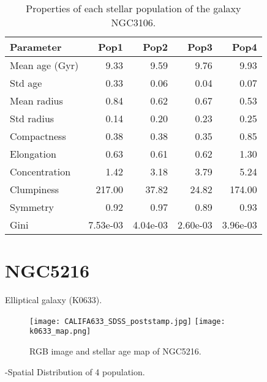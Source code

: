 \begin{table}[h]
\centering
\begin{tabular}{l|r|r|r|r}
Parameter & Pop1 & Pop2 & Pop3 & Pop4 \\\hline
Mean age (Gyr) & 9.33 & 9.59 & 9.76 & 9.93 \\
Std age & 0.33 & 0.06 & 0.04 & 0.07 \\
Mean radius & 0.84 & 0.62 & 0.67 & 0.53 \\
Std radius & 0.14 & 0.20 & 0.23 & 0.25 \\
Compactness & 0.38 & 0.38 & 0.35 & 0.85 \\
Elongation & 0.63 & 0.61 & 0.62 & 1.30 \\
Concentration & 1.42 & 3.18 & 3.79 & 5.24  \\
Clumpiness & 217.00 & 37.82 & 24.82 & 174.00 \\
Symmetry & 0.92 & 0.97 & 0.89 & 0.93 \\
Gini & 7.53e-03 & 4.04e-03 & 2.60e-03 & 3.96e-03 \\
\end{tabular}
\caption{\label{tab:widgets}Properties of each stellar population of the galaxy NGC3106.}
\end{table}

\newpage
\section*{NGC5216}
Elliptical galaxy (K0633).

\begin{figure}[bh]
\begin{center}
\texttt{[image: CALIFA633\_SDSS\_poststamp.jpg]}
\texttt{[image: k0633\_map.png]}
\caption{RGB image and stellar age map of NGC5216.}
   \label{fig1}
\end{center}
\end{figure}

-Spatial Distribution of 4 population.


